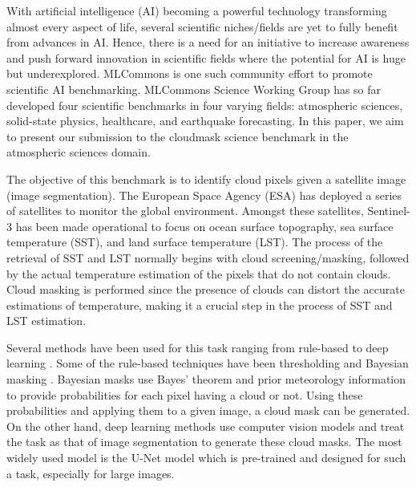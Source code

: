 \documentclass[sigplan,screen]{acmart}
\begin{document}
\nocite{las-2023-ai-workflow} %

With artificial intelligence (AI) becoming a powerful technology transforming almost every aspect of life, several scientific niches/fields are yet to fully benefit from advances in AI. Hence, there is a need for an initiative to increase awareness and push forward innovation in scientific fields where the potential for AI is huge but underexplored. 
MLCommons \cite{www-mlcommons-research}  is one such community effort to promote scientific AI benchmarking. MLCommons Science Working Group \cite{Thiyagalingam2022AIBF} has so far developed four scientific benchmarks in four varying fields: atmospheric sciences, solid-state physics, healthcare, and earthquake forecasting. In this paper, we aim to present our submission to the cloudmask science benchmark in the atmospheric sciences domain. 

The objective of this benchmark \cite{Thiyagalingam2022AIBF} is to identify cloud pixels given a satellite image (image segmentation). The European Space Agency (ESA) \cite{www-sentinel92} has deployed a series of satellites to monitor the global environment. Amongst these satellites, Sentinel-3 has been made operational to focus on ocean surface topography, sea surface temperature (SST), and land surface temperature (LST). The process of the retrieval of SST and LST normally begins with cloud screening/masking, followed by the actual temperature estimation of the pixels that do not contain clouds. Cloud masking is performed since the presence of clouds can distort the accurate estimations of temperature, making it a crucial step in the process of SST and LST estimation. 

Several methods have been used for this task ranging from rule-based \cite{Saunders1986AnAS,Saunders1988AnIM,Merchant2005ProbabilisticPB, Zhu2012ObjectbasedCA} to deep learning \cite{Li2019DeepLB,Domnich2021KappaMaskAC,Yan2018CloudAC,WIELAND2019111203,JEPPESEN2019247}. Some of the rule-based techniques have been thresholding \cite{Saunders1986AnAS,Saunders1988AnIM} and Bayesian masking \cite{Merchant2005ProbabilisticPB}. Bayesian masks use Bayes' theorem and prior meteorology information to provide probabilities for each pixel having a cloud or not. Using these probabilities and applying them to a given image, a cloud mask can be generated. On the other hand, deep learning methods \cite{Li2019DeepLB,Domnich2021KappaMaskAC,Yan2018CloudAC,WIELAND2019111203,JEPPESEN2019247} use computer vision models and treat the task as that of image segmentation to generate these cloud masks. The most widely used model is the U-Net \cite{Ronneberger2015UNetCN} model which is pre-trained and designed for such a task, especially for large images.
\end{document}
